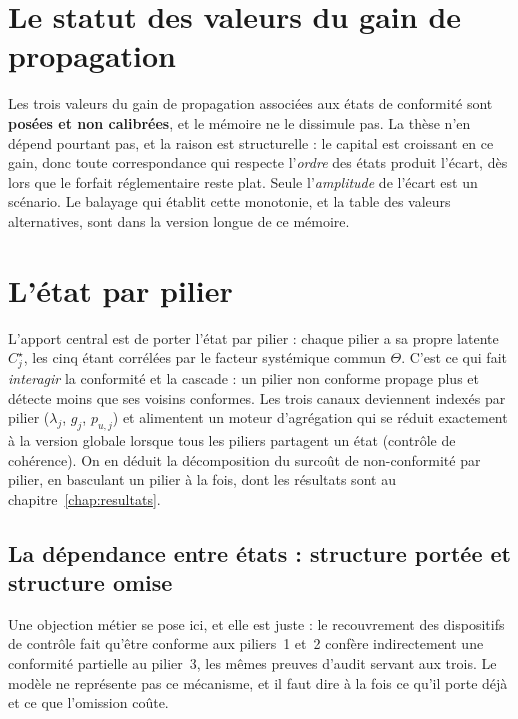 

\section{Le statut des valeurs du gain de propagation}
\label{sec:invariance-g}
Les trois valeurs du gain de propagation associées aux états de conformité sont
\textbf{posées et non calibrées}, et le mémoire ne le dissimule pas. La thèse n'en dépend
pourtant pas, et la raison est structurelle : le capital est croissant en ce gain, donc
toute correspondance qui respecte l'\emph{ordre} des états produit l'écart, dès lors que
le forfait réglementaire reste plat. Seule l'\emph{amplitude} de l'écart est un scénario.
Le balayage qui établit cette monotonie, et la table des valeurs alternatives, sont dans la version longue de ce mémoire.

\section{L'état par pilier}

L'apport central est de porter l'état par pilier : chaque pilier a sa propre latente
$C^\star_j$, les cinq étant corrélées par le facteur systémique commun $\Theta$. C'est ce qui
fait \emph{interagir} la conformité et la cascade : un pilier non conforme propage plus et
détecte moins que ses voisins conformes. Les trois canaux deviennent indexés par pilier
($\lambda_j$, $g_j$, $p_{u,j}$) et alimentent un moteur d'agrégation qui se réduit exactement à
la version globale lorsque tous les piliers partagent un état (contrôle de cohérence). On en
déduit la décomposition du surcoût de non-conformité par pilier, en basculant un pilier
à la fois, dont les résultats sont au chapitre~\ref{chap:resultats}.

\subsection{La dépendance entre états : structure portée et structure omise}
\label{sec:dependance-etats}


Une objection métier se pose ici, et elle est juste : le
recouvrement des dispositifs de contrôle fait qu'être conforme aux piliers~1 et~2 confère
indirectement une conformité partielle au pilier~3, les mêmes preuves d'audit servant aux trois.
Le modèle ne représente pas ce mécanisme, et il faut dire à la fois ce qu'il porte déjà et ce que
l'omission coûte.

